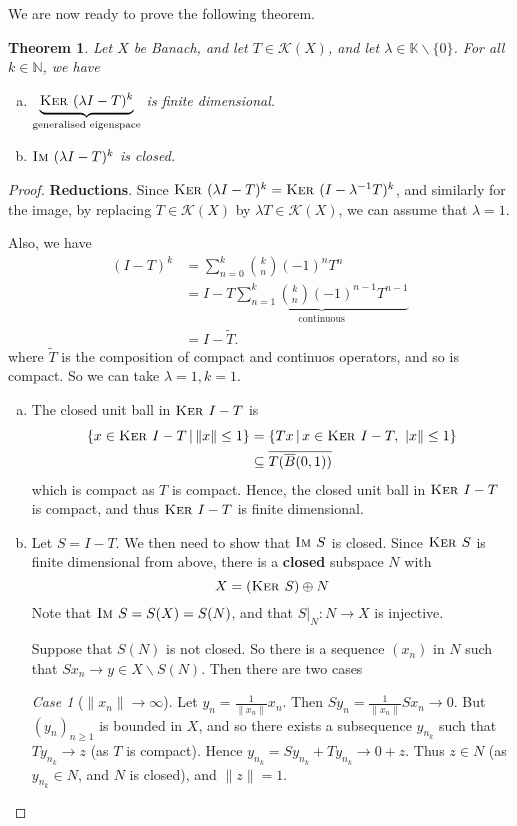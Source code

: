 \documentclass[10pt, reqno, oneside]{amsart}
\theoremstyle{plain}%
\newtheorem{thm}{Theorem}[section]
\theoremstyle{definition}
\theoremstyle{remark}
\newtheorem{case}{Case}
\newcommand{\given}{ \, | \,}
\newcommand{\K}{\mathbb{K}}
\newcommand{\N}{\mathbb{N}}
\newcommand{\im}{\textsc{Im\ }}
\renewcommand{\ker}{\textsc{Ker\ }}
\begin{document}
We are now ready to prove the following theorem.

\begin{thm}
	Let $X$ be Banach, and let $T \in \mathcal K(X)$, and let $\lambda \in \K \backslash \{ 0 \}$.  For all $k \in \N$, we have \begin{enumerate}[(a)]
		\item $\underbrace{\ker(\lambda I - T)^k}_{\text{generalised eigenspace}}$ is finite dimensional.
		\item $\im(\lambda I - T)^k$ is closed.   
	\end{enumerate}
\end{thm}
\begin{proof}
	\textbf{Reductions}.  Since $\ker(\lambda I - T)^k = \ker(I - \lambda^{-1}T)^k$, and similarly for the image, by replacing $T \in \mathcal K(X)$ by $\lambda T \in \mathcal K(X)$, we can assume that $\lambda = 1$.
	
	Also, we have \begin{align*}
		(I - T)^k 	&= \sum_{n=0}^k {k \choose n} (-1)^n T^n \\
					&= I - T \underbrace{\sum_{n = 1}^k {k \choose n} (-1)^{n-1} T^{n-1}}_\text{continuous}  \\
					&= I - \tilde T.
	\end{align*} where $\tilde T$ is the composition of compact and continuos operators, and so is compact.  So we can take $\lambda = 1, k = 1$.  
	
	\begin{enumerate}[(a)]
		\item The closed unit ball in $\ker I - T$ is \begin{align*}
		\{ x \in \ker I - T \given \| x \| \leq 1 \} &= \{ Tx \given x \in \ker I - T, \ | x \| \leq 1 \} \\
		&\subseteq \overline{T (\overline B(0, 1))}
		\end{align*} which is compact as $T$ is compact.  Hence, the closed unit ball in $\ker I - T$ is compact, and thus $\ker I - T$ is finite dimensional.
		\item Let $S = I - T$.  We then need to show that $\im S$ is closed.  Since $\ker S$ is finite dimensional from above, there is a \textbf{closed} subspace $N$ with \[
			X = (\ker S) \oplus N
		\]  Note that $\im S = S(X) = S(N)$, and that $S |_N : N \rightarrow X$ is injective. 
		
		Suppose that $S(N)$ is not closed.  So there is a sequence $(x_n)$ in $N$ such that $Sx_n \rightarrow y \in X \backslash S(N)$. Then there are two cases
		\begin{case}[$\| x_n \| \rightarrow \infty$]  Let $y_n = \frac{1}{\| x_n \|} x_n$.  Then $Sy_n = \frac{1}{\| x_n \|} S x_n \rightarrow 0$.  But $(y_n)_{ n \geq 1}$ is bounded in $X$, and so there exists a subsequence $y_{n_k}$ such that $T y_{n_k} \rightarrow z$ (as $T$ is compact).  Hence $y_{n_k} = S y_{n_k} + T y_{n_k} \rightarrow 0 + z$.  Thus $z \in N$ (as $y_{n_k} \in N$, and $N$ is closed), and $\| z \| = 1$.  
			

\end{case}
\end{enumerate}
\end{proof}
\end{document}

